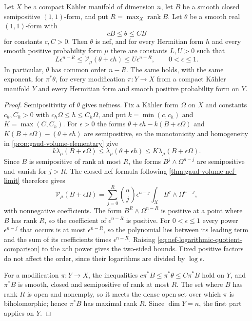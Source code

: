 \begin{lemma}\label{lem:nef-logarithmic-rank-comparison}\label{prop:nef-maximum-rank-comparison}
Let $X$ be a compact K\"ahler manifold of dimension $n$, let $B$ be a smooth closed semipositive $(1,1)$-form, and put $R=\max_X\operatorname{rank}B$. Let $\theta$ be a smooth real $(1,1)$-form with
\[
 cB\leq\theta\leq CB
\]
for constants $c,C>0$. Then $\theta$ is nef, and for every Hermitian form $h$ and every smooth positive probability form $\mu$ there are constants $L,U>0$ such that
\[
 L\epsilon^{n-R}\leq\mathcal V_\mu(\theta+\epsilon h)
                       \leq U\epsilon^{n-R},\qquad 0<\epsilon\leq1.
\]
In particular, $\theta$ has common order $n-R$. The same holds, with the same exponent, for $\pi^*\theta$, for every modification $\pi\colon Y\to X$ from a compact K\"ahler manifold $Y$ and every Hermitian form and smooth positive probability form on $Y$.
\end{lemma}
\begin{proof}
Semipositivity of $\theta$ gives nefness. Fix a K\"ahler form $\Omega$ on $X$ and constants $c_h,C_h>0$ with $c_h\Omega\leq h\leq C_h\Omega$, and put $k=\min(c,c_h)$ and $K=\max(C,C_h)$. For $\epsilon>0$ the forms $\theta+\epsilon h-k(B+\epsilon\Omega)$ and $K(B+\epsilon\Omega)-(\theta+\epsilon h)$ are semipositive, so the monotonicity and homogeneity in \cref{prop:gaud-volume-elementary} give
\begin{equation}\label{eq:nef-logarithmic-quotient-comparison}
 k\lambda_\mu(B+\epsilon\Omega)
 \leq\lambda_\mu(\theta+\epsilon h)
 \leq K\lambda_\mu(B+\epsilon\Omega).
\end{equation}
Since $B$ is semipositive of rank at most $R$, the forms $B^j\wedge\Omega^{n-j}$ are semipositive and vanish for $j>R$. The closed nef formula following \cref{thm:gaud-volume-nef-limit} therefore gives
\begin{equation}\label{eq:nef-projective-pointwise-volume}
 \mathcal V_\mu(B+\epsilon\Omega)
 =\sum_{j=0}^{R}\binom nj\epsilon^{n-j}
                         \int_X B^j\wedge\Omega^{n-j},
\end{equation}
with nonnegative coefficients. The form $B^R\wedge\Omega^{n-R}$ is positive at a point where $B$ has rank $R$, so the coefficient of $\epsilon^{n-R}$ is positive. For $0<\epsilon\leq1$ every power $\epsilon^{n-j}$ that occurs is at most $\epsilon^{n-R}$, so the polynomial lies between its leading term and the sum of its coefficients times $\epsilon^{n-R}$. Raising \eqref{eq:nef-logarithmic-quotient-comparison} to the $n$th power gives the two-sided bounds. Fixed positive factors do not affect the order, since their logarithms are divided by $\log\epsilon$.

For a modification $\pi\colon Y\to X$, the inequalities $c\pi^*B\leq\pi^*\theta\leq C\pi^*B$ hold on $Y$, and $\pi^*B$ is smooth, closed and semipositive of rank at most $R$. The set where $B$ has rank $R$ is open and nonempty, so it meets the dense open set over which $\pi$ is biholomorphic; hence $\pi^*B$ has maximal rank $R$. Since $\dim Y=n$, the first part applies on $Y$.
\end{proof}


